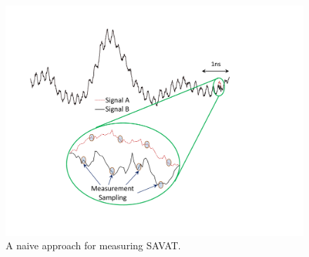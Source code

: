 \begin{figure}[thb]
\centering
\includegraphics[trim=0.8in 1.1in 2.7in 0.8in,clip,width=5in]{../savat_final/Drawing/NaiveMeasurement.pdf}
\caption{A naive approach for measuring SAVAT.}
\label{NaiveMeasurement}
\end{figure}

